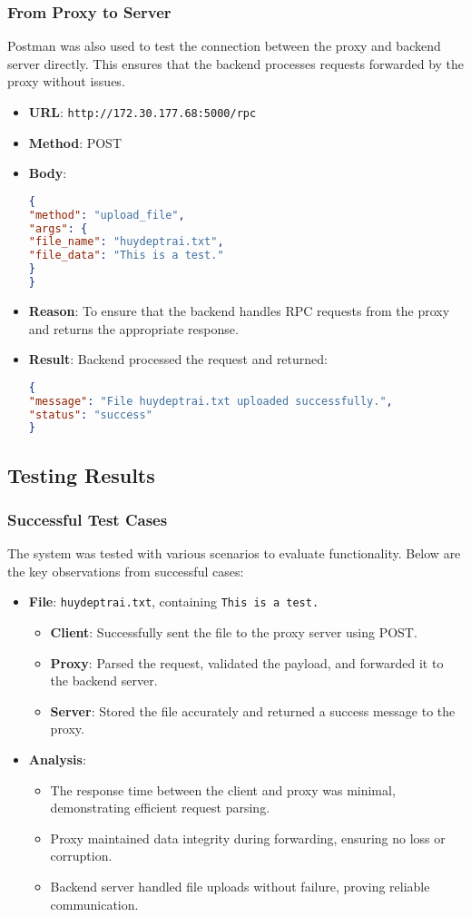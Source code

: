 \documentclass{article}
\begin{document}
\subsubsection*{From Proxy to Server}
Postman was also used to test the connection between the proxy and backend server directly. This ensures that the backend processes requests forwarded by the proxy without issues.
\begin{itemize}
\item \textbf{URL}: \texttt{http://172.30.177.68:5000/rpc}
\item \textbf{Method}: POST
\item \textbf{Body}:
\begin{lstlisting}[language=JSON]
{
"method": "upload_file",
"args": {
"file_name": "huydeptrai.txt",
"file_data": "This is a test."
}
}
\end{lstlisting}
\item \textbf{Reason}: To ensure that the backend handles RPC requests from the proxy and returns the appropriate response.
\item \textbf{Result}: Backend processed the request and returned:
\begin{lstlisting}[language=JSON]
{
"message": "File huydeptrai.txt uploaded successfully.",
"status": "success"
}
\end{lstlisting}
\end{itemize}

\subsection*{Testing Results}

\subsubsection*{Successful Test Cases}
The system was tested with various scenarios to evaluate functionality. Below are the key observations from successful cases:
\begin{itemize}
\item \textbf{File}: \texttt{huydeptrai.txt}, containing \texttt{This is a test.}
\begin{itemize}
\item \textbf{Client}: Successfully sent the file to the proxy server using POST.
\item \textbf{Proxy}: Parsed the request, validated the payload, and forwarded it to the backend server.
\item \textbf{Server}: Stored the file accurately and returned a success message to the proxy.
\end{itemize}
\item \textbf{Analysis}:
\begin{itemize}
\item The response time between the client and proxy was minimal, demonstrating efficient request parsing.
\item Proxy maintained data integrity during forwarding, ensuring no loss or corruption.
\item Backend server handled file uploads without failure, proving reliable communication.
\end{itemize}
\end{itemize}
\end{document}
